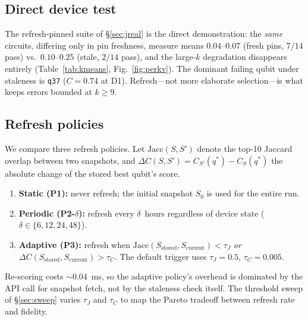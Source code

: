 \documentclass[journal,10pt,twocolumn]{IEEEtran}
\newcommand{\q}[1]{\texttt{q#1}}
\begin{document}
\subsection{Direct device test}
The refresh-pinned suite of \S\ref{sec:jreal} is the direct demonstration: the \emph{same} circuits, differing only
in pin freshness, measure means $0.04$--$0.07$ (fresh pins, $7/14$ pass) vs.\ $0.10$--$0.25$ (stale, $2/14$ pass),
and the large-$k$ degradation disappears entirely (Table~\ref{tab:kmeans}, Fig.~\ref{fig:perkv}). The dominant
failing qubit under staleness is \q{37} ($C{=}0.74$ at D1). Refresh---not more elaborate selection---is what keeps
errors bounded at $k\ge9$.

\subsection{Refresh policies}
\label{sec:policies}
We compare three refresh policies. Let $\mathrm{Jacc}(S, S')$ denote the top-10 Jaccard overlap between two
snapshots, and $\Delta C(S, S') = C_{S'}(q^*) - C_S(q^*)$ the absolute change of the stored best qubit's score.
\begin{enumerate}[leftmargin=1.6em,itemsep=1pt,topsep=2pt]
\item \textbf{Static (P1):} never refresh; the initial snapshot $S_0$ is used for the entire run.
\item \textbf{Periodic (P2-$\delta$):} refresh every $\delta$~hours regardless of device state
($\delta \in \{6, 12, 24, 48\}$).
\item \textbf{Adaptive (P3):} refresh when $\mathrm{Jacc}(S_{\mathrm{stored}}, S_{\mathrm{current}}) < \tau_J$
\emph{or} $\Delta C(S_{\mathrm{stored}}, S_{\mathrm{current}}) > \tau_C$. The default trigger uses
$\tau_J{=}0.5$, $\tau_C{=}0.005$.
\end{enumerate}
Re-scoring costs $\sim0.04$~ms, so the adaptive policy's overhead is dominated by the API call for snapshot
fetch, not by the staleness check itself. The threshold sweep of \S\ref{sec:sweep} varies $\tau_J$ and $\tau_C$
to map the Pareto tradeoff between refresh rate and fidelity.
\end{document}
